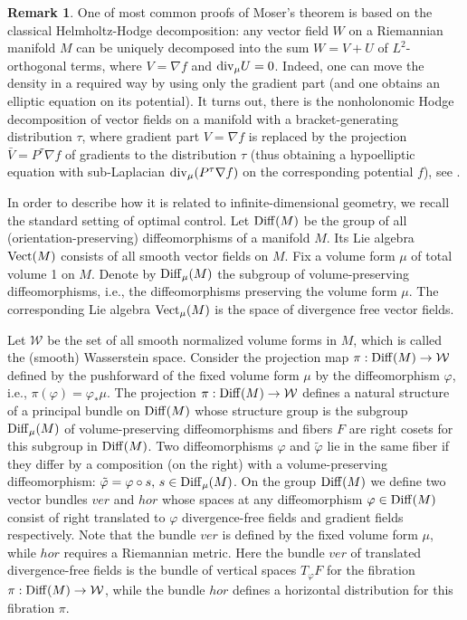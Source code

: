 \documentclass[11pt]{article}
\theoremstyle{definition}
\newtheorem{remark}[lemma]{Remark}
\newcounter{ai}
\begin{document}
\begin{remark}
One of most common proofs of Moser's theorem is based on  the classical Helmholtz-Hodge 
decomposition: any vector field $W$ on a Riemannian manifold $M$ can be uniquely decomposed into the sum
$W =  V +  U$ of $L^2$-orthogonal terms, where $  V= \nabla f$ and ${\rm div}_\mu  U = 0$. Indeed, one can move the density in a required way by using only the gradient part (and one obtains an elliptic equation on its potential). It turns out, there is the
 nonholonomic Hodge decomposition of vector fields on a manifold
with a bracket-generating distribution $\tau$, 
where gradient part $V=\nabla f$ is replaced by the projection $\bar V=P^\tau\nabla f$
of gradients  to the distribution $\tau$ (thus obtaining a hypoelliptic equation with sub-Laplacian ${\rm div}_\mu (P^\tau \nabla f)$ on the corresponding potential $f$), see \cite{khesin2009nonholonomic}.
\end{remark}

In order to describe how it is related to infinite-dimensional geometry, we recall the standard setting of optimal control. Let ${\rm Diff}(M)$ be the group 
of all (orientation-preserving) diffeomorphisms of a manifold $M$. Its Lie algebra ${\rm Vect}(M)$
 consists of all smooth vector fields on $M$. 
Fix a volume form $\mu$ of total volume 1 on $M$. Denote by
${\rm Diff}_\mu(M)$ the subgroup of volume-preserving diffeomorphisms, i.e., the diffeomorphisms
preserving the volume form $\mu$. The corresponding Lie algebra ${\rm Vect}_\mu(M)$ is
the space of divergence free vector fields.

Let $\mathcal W$ be the set of all smooth normalized volume forms in $M$, which is
called the (smooth) Wasserstein space. Consider the projection map $\pi: {\rm Diff}(M)\to \mathcal W$
defined by the pushforward of the fixed volume form $\mu$ by the
diffeomorphism $\varphi$, i.e., $\pi(\varphi)=\varphi_*\mu$. The projection  $\pi: {\rm Diff}(M)\to \mathcal W$ defines
a natural structure of a principal bundle on ${\rm Diff}(M)$ whose structure group is the
subgroup ${\rm Diff}_\mu(M)$ of volume-preserving diffeomorphisms  and fibers $F$ are
right cosets for this subgroup in ${\rm Diff}(M)$. Two diffeomorphisms $\varphi$ and $\tilde \varphi$ lie in
the same fiber if they differ by a composition (on the right) with a volume-preserving
diffeomorphism: $\tilde \varphi = \varphi\circ s, \, s\in {\rm Diff}_\mu(M)$.
On the group ${\rm Diff} (M)$ we define two vector bundles $ver$ and $hor$ whose spaces
at any diffeomorphism $\varphi\in {\rm Diff}(M)$ consist of right translated to $\varphi$ divergence-free fields
and gradient fields
respectively. Note that the bundle $ver$ is defined by the fixed volume form $\mu$, while $hor$ requires a Riemannian metric. Here the bundle $ver$ of translated divergence-free fields is the
bundle of vertical spaces $T_\varphi F$ for the fibration $\pi: {\rm Diff}(M)\to \mathcal W$, while the bundle $hor$
defines a horizontal distribution for this fibration $\pi$.
\end{document}

